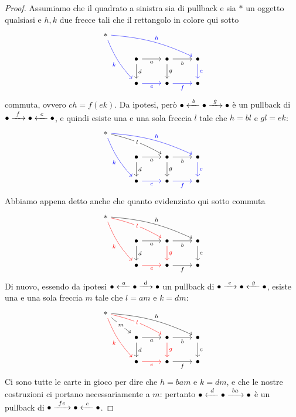 \begin{proof}
Assumiamo che il quadrato a sinistra sia di pullback e sia \(\ast\) un oggetto qualsiasi e \(h, k\) due frecce tali che il rettangolo in colore qui sotto
%
\[\begin{tikzcd}
\ast \ar["h", bend left=10, drrr, blue] \ar["k", bend right=10, ddr, swap, blue] & & & \\
& \bullet \ar["a", r, swap] \ar["d", d] & \bullet \ar["b", r, swap] \ar["g", d] & \bullet \ar["c", d, blue]\\
& \bullet \ar["e", r, swap, blue] & \bullet \ar["f", r, swap, blue] & \bullet
\end{tikzcd}\]
%
commuta, ovvero \(ch=f(ek)\). Da ipotesi, però \(\bullet \xleftarrow{\ b\ } \bullet \xrightarrow{\ g\ } \bullet\) è un pullback di \(\bullet \xrightarrow{\ f\ } \bullet \xleftarrow{\ c\ } \bullet\), e quindi esiste una e una sola freccia \(l\) tale che \(h = bl\) e \(gl = ek\):
%
\[\begin{tikzcd}
\ast \ar["h", bend left=10, drrr, blue] \ar["k", bend right=10, ddr, swap, blue] \ar["l"{description}, bend left=8, drr] & & & \\
& \bullet \ar["a", r, swap] \ar["d", d] & \bullet \ar["b", r, swap] \ar["g", d] & \bullet \ar["c", d, blue]\\
& \bullet \ar["e", r, swap, blue] & \bullet \ar["f", r, swap, blue] & \bullet
\end{tikzcd}\]
%
Abbiamo appena detto anche che quanto evidenziato qui sotto commuta
%
\[\begin{tikzcd}
\ast \ar["h", bend left=10, drrr] \ar["k", bend right=10, ddr, swap, red] \ar["l"{description}, drr, bend left=8, red] & & & \\
& \bullet \ar["a", r, swap] \ar["d", d] & \bullet \ar["b", r, swap] \ar["g", d, red] & \bullet \ar["c", d]\\
& \bullet \ar["e", r, swap, red] & \bullet \ar["f", r, swap] & \bullet
\end{tikzcd}\]
%
Di nuovo, essendo da ipotesi \(\bullet \xleftarrow{\ a\ } \bullet \xrightarrow{\ d\ } \bullet\) un pullback di \(\bullet \xrightarrow{\ e\ } \bullet \xleftarrow{\ g\ } \bullet\), esiste una e una sola freccia \(m\) tale che \(l = am\) e \(k = dm\):
%
\[\begin{tikzcd}
\ast \ar["h", bend left=10, drrr] \ar["k", bend right=10, ddr, swap, red] \ar["l"{description}, drr, bend left=8, red] \ar["m"{description}, dr] & & & \\
& \bullet \ar["a", r, swap] \ar["d", d] & \bullet \ar["b", r, swap] \ar["g", d, red] & \bullet \ar["c", d]\\
& \bullet \ar["e", r, swap, red] & \bullet \ar["f", r, swap] & \bullet
\end{tikzcd}\]
%
Ci sono tutte le carte in gioco per dire che \(h = bam\) e \(k = dm\), e che le nostre costruzioni ci portano necessariamente a \(m\): pertanto \(\bullet \xleftarrow{\ d\ } \bullet \xrightarrow{\ ba\ } \bullet\) è un pullback di \(\bullet \xrightarrow{\ fe\ } \bullet \xleftarrow{\ c\ } \bullet\).\newline
\end{proof}

